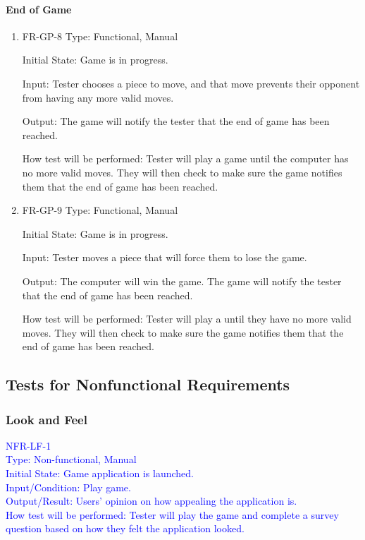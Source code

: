 \documentclass[12pt, titlepage]{article}
\begin{document}
\paragraph{End of Game}
\begin{enumerate}
    \item{FR-GP-8}
    Type: Functional, Manual
    
    Initial State: Game is in progress.
    					
    Input: Tester chooses a piece to move, and that move prevents their opponent from having any more valid moves.
    					
    Output: The game will notify the tester that the end of game has been reached.
    					
    How test will be performed: Tester will play a game until the computer has no more valid moves. They will then check to make sure the game notifies them that the end of game has been reached.
    \item{FR-GP-9}
    Type: Functional, Manual
    
    Initial State: Game is in progress.
    					
    Input: Tester moves a piece that will force them to lose the game.
    					
    Output: The computer will win the game. The game will notify the tester that the end of game has been reached.
    					
    How test will be performed: Tester will play a until they have no more valid moves. They will then check to make sure the game notifies them that the end of game has been reached.
\end{enumerate}
\subsection{Tests for Nonfunctional Requirements}

\subsubsection{Look and Feel}

\begin{enumerate}
\textcolor{blue}{
\item{}NFR-LF-1\\ 
Type: Non-functional, Manual\\
Initial State: Game application is launched.\\
Input/Condition: Play game.\\
Output/Result: Users' opinion on how appealing the application is.\\
How test will be performed: Tester will play the game and complete a survey question based on how they felt the application looked.}



\end{enumerate}
\end{document}

